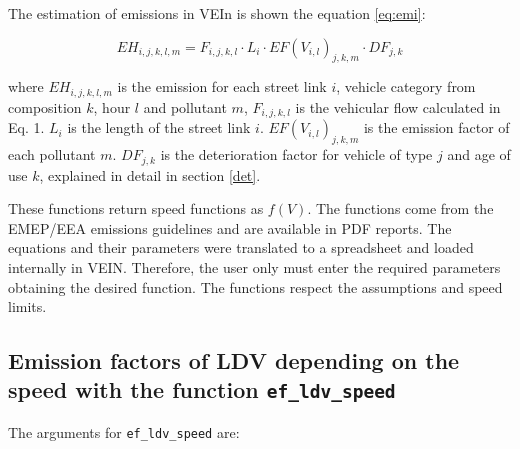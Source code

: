\documentclass[12pt,graybox,envcountchap,sectrefs]{krantz}
\theoremstyle{definition}
\theoremstyle{definition}
\theoremstyle{definition}
\theoremstyle{remark}
\begin{document}
The estimation of emissions in VEIn is shown the equation \eqref{eq:emi}:

\begin{equation}
EH_{i,j,k,l,m} =F_{i,j,k,l} \cdot L_i \cdot EF(V_{i,l})_{j,k,m} \cdot DF_{j,k}
\label{eq:emi}
\end{equation}

where \(EH_{i,j,k,l,m}\) is the emission for each street link \(i\),
vehicle category from composition \(k\), hour \(l\) and pollutant \(m\),
\(F_{i,j,k,l}\) is the vehicular flow calculated in Eq. 1. \(L_i\) is
the length of the street link \(i\). \(EF(V_{i,l})_{j,k,m}\) is the
emission factor of each pollutant \(m\). \(DF_{j,k}\) is the
deterioration factor for vehicle of type \(j\) and age of use \(k\),
explained in detail in section \ref{det}.

These functions return speed functions as \(f(V)\). The functions come
from the EMEP/EEA emissions guidelines \citep{NtziachristosSamaras2016}
and are available in PDF reports. The equations and their parameters
were translated to a spreadsheet and loaded internally in VEIN.
Therefore, the user only must enter the required parameters obtaining
the desired function. The functions respect the assumptions and speed
limits.

\subsection{\texorpdfstring{Emission factors of LDV depending on the
speed with the function
\texttt{ef\_ldv\_speed}}{Emission factors of LDV depending on the speed with the function ef\_ldv\_speed}}\label{emission-factors-of-ldv-depending-on-the-speed-with-the-function-ef_ldv_speed}

The arguments for \texttt{ef\_ldv\_speed} are:
\end{document}
